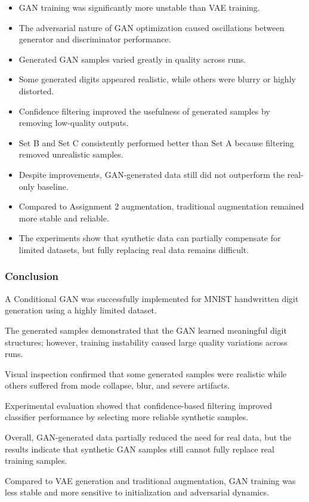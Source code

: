 \begin{itemize}

\item GAN training was significantly more unstable than VAE training.

\item The adversarial nature of GAN optimization caused oscillations between generator and discriminator performance.

\item Generated GAN samples varied greatly in quality across runs.

\item Some generated digits appeared realistic, while others were blurry or highly distorted.

\item Confidence filtering improved the usefulness of generated samples by removing low-quality outputs.

\item Set B and Set C consistently performed better than Set A because filtering removed unrealistic samples.

\item Despite improvements, GAN-generated data still did not outperform the real-only baseline.

\item Compared to Assignment 2 augmentation, traditional augmentation remained more stable and reliable.

\item The experiments show that synthetic data can partially compensate for limited datasets, but fully replacing real data remains difficult.

\end{itemize}

\subsubsection{Conclusion}

A Conditional GAN was successfully implemented for MNIST handwritten digit generation using a highly limited dataset.

The generated samples demonstrated that the GAN learned meaningful digit structures; however, training instability caused large quality variations across runs.

Visual inspection confirmed that some generated samples were realistic while others suffered from mode collapse, blur, and severe artifacts.

Experimental evaluation showed that confidence-based filtering improved classifier performance by selecting more reliable synthetic samples.

Overall, GAN-generated data partially reduced the need for real data, but the results indicate that synthetic GAN samples still cannot fully replace real training samples.

Compared to VAE generation and traditional augmentation, GAN training was less stable and more sensitive to initialization and adversarial dynamics.

\endgroup